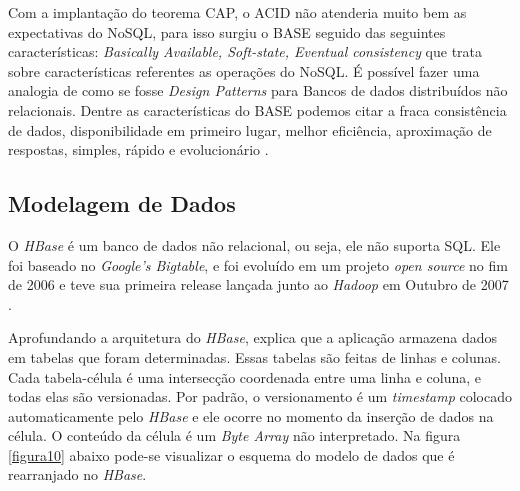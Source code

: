             Com a implantação do teorema CAP, o ACID não atenderia muito bem as expectativas do NoSQL, para isso surgiu o
            BASE seguido das seguintes características:  \textit{Basically Available, Soft-state, Eventual consistency} que trata
            sobre características referentes as operações do NoSQL. É possível fazer uma analogia de como se fosse \textit{Design
            Patterns} para Bancos de dados distribuídos não relacionais. Dentre as características do BASE podemos citar a fraca
            consistência de dados, disponibilidade em primeiro lugar, melhor eficiência, aproximação de respostas, simples, rápido
            e evolucionário \cite{moniruzzaman2013}.

        \subsection{Modelagem de Dados}

            O \textit{HBase} é um banco de dados não relacional, ou seja, ele não suporta SQL. Ele foi baseado no \textit{Google’s
            Bigtable}, e foi evoluído em um projeto \textit{open source} no fim de 2006 e teve sua primeira release lançada junto ao
            \textit{Hadoop} em Outubro de 2007 \cite{white2015}.

            Aprofundando a arquitetura do \textit{HBase},  explica que a aplicação armazena dados em
            tabelas que foram determinadas. Essas tabelas são feitas de linhas e colunas. Cada tabela-célula é uma intersecção
            coordenada entre uma linha e coluna, e todas elas são versionadas. Por padrão, o versionamento é um \textit{timestamp}
            colocado automaticamente pelo \textit{HBase} e ele ocorre no momento da inserção de dados na célula. O conteúdo da
            célula é um \textit{Byte Array} não interpretado. Na figura \ref{figura10} abaixo pode-se visualizar o esquema do modelo
            de dados que é rearranjado no \textit{HBase}.

